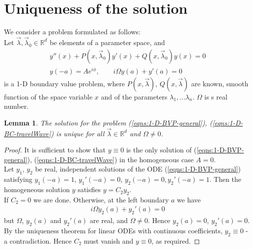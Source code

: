 \documentclass[12pt,twoside]{report}
\newtheorem{lem}{Lemma}[subsubsection]
\begin{document}
\section{Uniqueness of the solution}

We consider a problem formulated as follows:\\
Let $\overrightarrow{\lambda}, \overrightarrow{\lambda}_0 \in \mathbb{R}^d$ be elements of a parameter space, and
\begin{subequations}
\begin{align}
\label{eqns:1-D-BVP-general}
y''(x) + P(x, \overrightarrow{\lambda}_0)y'(x) + Q(x, \overrightarrow{\lambda}_0)y(x) =0 \\
\label{eqns:1-D-BC-travelWave}
y(-a) = Ae^{i\phi}, \qquad i \Omega y(a) + y'(a)=0
\end{align}
\end{subequations}
is a 1-D boundary value problem, where $P(x, \overrightarrow{\lambda})$, $Q(x, \overrightarrow{\lambda})$ are known, smooth function of the space variable $x$ and of the parameters $\lambda_1, \ldots \lambda_n$. $\Omega$ is s real number.\\

\begin{lem}
The solution for the problem (\ref{eqns:1-D-BVP-general}), (\ref{eqns:1-D-BC-travelWave}) is unique for all $\overrightarrow{\lambda} \in \mathbb{R}^d $ and $\Omega \neq 0$.
\end{lem}
\begin{proof}
It is sufficient to show that $y \equiv 0$ is the only solution of (\ref{eqns:1-D-BVP-general}), (\ref{eqns:1-D-BC-travelWave}) in the homogeneous case $A=0$.\\
Let $y_1$, $y_2$ be real, independent solutions of the ODE (\ref{eqns:1-D-BVP-general}) satisfying $y_1(-a)=1$, $y_1'(-a)=0$, $y_2(-a)=0, y_2'(-a)=1$. Then the homogeneous solution $y$ satisfies $y=C_2 y_2$.\\
If $C_2 = 0$ we are done. Otherwise, at the left boundary $a$ we have
\begin{align*}
i\Omega y_2(a) + y_2'(a) = 0 
\end{align*}
but $\Omega$, $y_2(a)$ and $y_2'(a)$ are real, and $\Omega \neq 0$. Hence $y_2(a) = 0$, $y_2'(a)=0$. By the uniqueness theorem for linear ODEs with continuous coefficients, $y_2 \equiv 0$ - a contradiction. Hence $C_2$ must vanish and $y \equiv 0$, as required. 
\end{proof}
\end{document}
